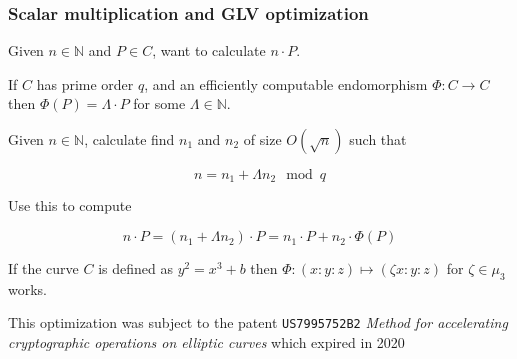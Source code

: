 \documentclass[options]{beamer}
\begin{document}
\begin{frame}[fragile]
    \frametitle{Scalar multiplication and GLV optimization}

    Given $n \in \mathbb{N}$ and $P \in C$, want to calculate $n \cdot P$.

    \vspace{6pt}
    \pause

    If $C$ has prime order $q$, and an efficiently computable endomorphism $\Phi : C \to C$ then
    $\Phi(P) = \Lambda \cdot P$ for some $\Lambda \in \mathbb{N}$.

    Given $n \in \mathbb N$, calculate find $n_1$ and $n_2$ of size $O(\sqrt n)$ such that
    
    $$
    n = n_1 + \Lambda n_2 \mod q
    $$

    \vspace{6pt}
    \pause

    Use this to compute 

    $$n \cdot P = (n_1 + \Lambda n_2) \cdot P = n_1 \cdot P + n_2 \cdot \Phi(P)$$

    \vspace{6pt}
    \pause

    If the curve $C$ is defined as $y^2 = x^3 + b$ then $\Phi:(x : y : z) \mapsto (\zeta x : y : z)$ for $\zeta \in \mu_3$ works.

    \pause
    \vspace{6pt}

    This optimization was subject to the patent \verb+US7995752B2+
    \emph{Method for accelerating cryptographic operations on elliptic curves}
    which expired in 2020

\end{frame}
\end{document}
